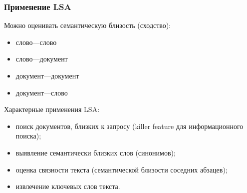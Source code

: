 \documentclass[svgnames]{beamer}
\begin{document}
\begin{frame}
  \frametitle{Применение LSA}
  Можно оценивать семантическую близость (сходство):
  \begin{itemize}
  \item слово—слово
  \item слово—документ
  \item документ—документ
  \item документ—слово
  \end{itemize}
  Характерные применения LSA:
  \begin{itemize}
  \item поиск документов, близких к запросу (killer feature для
    информационного поиска);
  \item выявление семантически близких слов (синонимов);
  \item оценка связности текста (семантической близости соседних абзацев);
  \item извлечение ключевых слов текста.
  \end{itemize}
\end{frame}
\end{document}
